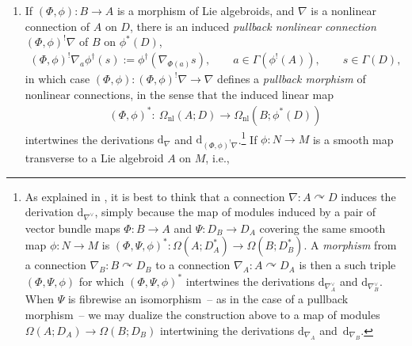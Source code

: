 \documentclass[11pt]{article}
\numberwithin{equation}{section}
\newcommand{\rmap}{\longrightarrow}
\newcommand{\acts}{\curvearrowright}
\newcommand{\C}{\mathbb{C}}
\newcommand{\dd}{\mathrm{d}}
\newcommand{\8}{\infty}
\begin{document}
\begin{enumerate}
\begin{gather*}
\end{gather*}and it is always the case that $\dd_{\nabla}R_{\nabla} = 0$. If $R_{\nabla}=0$, we call $\nabla$ a \emph{nonlinear representation}. Because the supertrace $\operatorname{Tr}_s(T)=\operatorname{Tr}(T_{00})-\operatorname{Tr}(T_{11})$ induces a linear map intertwining derivations,\begin{gather*}\operatorname{Tr}_s \colon \ \Omega_{\mathrm{nl}}(A;\operatorname{End}(D)) \rmap \Omega_{\mathrm{nl}}(A;\C), \qquad \dd_A\operatorname{Tr}_s = \operatorname{Tr}_s\dd_{\nabla},\end{gather*}it follows in general that $\operatorname{Tr}_s\big(R_{\nabla}^q\big) \in \Omega^{2q}_{\mathrm{nl}}(A;\C)$ are $\dd_A$-closed for every integer $q$; see \cite{CrainicNL}.
 \item If $(\Phi,\phi)\colon B \to A$ is a morphism of Lie algebroids, and $\nabla$ is a nonlinear connection of $A$ on $D$, there is an induced \emph{pullback nonlinear connection} $(\Phi,\phi)^!\nabla$ of $B$ on $\phi^*(D)$,
 \begin{align*}\label{eq : pullback connection}
 (\Phi,\phi)^!\nabla_{a}\phi^{\dagger}(s):=\phi^{\dagger}(\nabla_{\Phi(a)}s), \qquad a \in \Gamma(\phi^!(A)), \qquad s \in \Gamma(D),
 \end{align*}in which case $(\Phi,\phi)\colon (\Phi,\phi)^!\nabla \to \nabla$ defines a \emph{pullback morphism} of nonlinear connections, in the sense that the induced linear map
 \begin{gather*}
 (\Phi,\phi)^*\colon \ \Omega_{\mathrm{nl}}(A;D)\to \Omega_{\mathrm{nl}}(B;\phi^*(D))
 \end{gather*}intertwines the derivations $\dd_{\nabla}$ and $\dd_{(\Phi,\phi)^!\nabla}$.\footnote{As explained in \cite{YvetteLaurentAlan}, it is best to think that a connection $\nabla \colon A \acts D$ induces the derivation $\dd_{\nabla^{\vee}}$, simply because the map of modules induced by a pair of vector bundle maps $\Phi\colon B \to A$ and $\Psi\colon D_B \to D_A$ covering the same smooth map $\phi\colon N \to M$ is $(\Phi,\Psi,\phi)^*\colon \Omega(A;D_A^*) \to \Omega(B;D_B^*)$. A \emph{morphism} from a connection $\nabla_B\colon B \acts D_B$ to a connection $\nabla_A \colon A \acts D_A$ is then a such triple $(\Phi,\Psi,\phi)$ for which $(\Phi,\Psi,\phi)^*$ intertwines the derivations $\dd_{\nabla^{\vee}_A}$ and $\dd_{\nabla^{\vee}_B}$. When $\Psi$ is fibrewise an isomorphism~-- as in the case of a pullback morphism~-- we may dualize the construction above to a map of modules $\Omega(A;D_A) \to \Omega(B;D_B)$ intertwining the derivations $\dd_{\nabla_A}$ and~$\dd_{\nabla_B}$.} If $\phi\colon N \to M$ is a smooth map transverse to a Lie algebroid $A$ on $M$, i.e.,

\end{enumerate}
\end{document}
